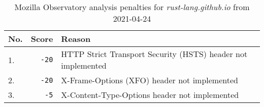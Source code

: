 \begin{table}[h]
    \begin{tabularx}{\textwidth}{|l|r|X|}
        \hline
        \textbf{No.} & \textbf{Score} & \textbf{Reason}                                              \\ \hline
        1.           & \texttt{-20}   & HTTP Strict Transport Security (HSTS) header not implemented \\ \hline
        2.           & \texttt{-20}   & X-Frame-Options (XFO) header not implemented                 \\ \hline
        3.           & \texttt{-5}    & X-Content-Type-Options header not implemented                \\ \hline
    \end{tabularx}
    \caption{Mozilla Observatory analysis penalties for \emph{rust-lang.github.io} from 2021-04-24}
    \label{tab:scan.rust-lang.github.io.2021-04-24}
\end{table}
